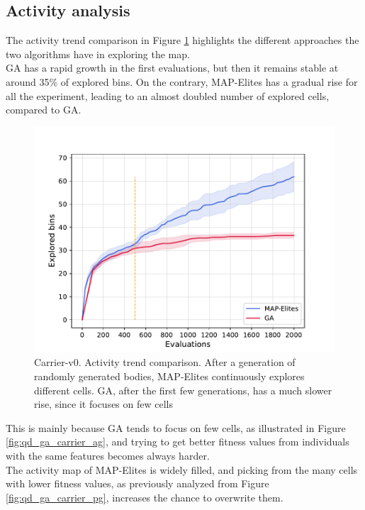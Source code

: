 \subsection{Activity analysis}
The activity trend comparison in Figure \ref{fig:qd_ga_carrier_at} highlights the different approaches the two algorithms have in exploring the map.\\
GA has a rapid growth in the first evaluations, but then it remains stable at around 35\% of explored bins.
On the contrary, MAP-Elites has a gradual rise for all the experiment, leading to an almost doubled number of explored cells, compared to GA.

\begin{figure}[h]
    \centering
    \includegraphics[scale=0.65]{images/brain_opt/carrier/comp_qd_ga_c_at}
    \caption{Carrier-v0. Activity trend comparison.
    After a generation of randomly generated bodies, MAP-Elites continuously explores different cells. GA, after the first few generations, has a much slower rise, since it focuses on few cells}
    \label{fig:qd_ga_carrier_at}
\end{figure}

This is mainly because GA tends to focus on few cells, as illustrated in Figure \ref{fig:qd_ga_carrier_ag}, and trying to get better fitness values from individuals with the same features becomes always harder.\\
The activity map of MAP-Elites is widely filled, and picking from the many cells with lower fitness values, as previously analyzed from Figure \ref{fig:qd_ga_carrier_pg}, increases the chance to overwrite them.

